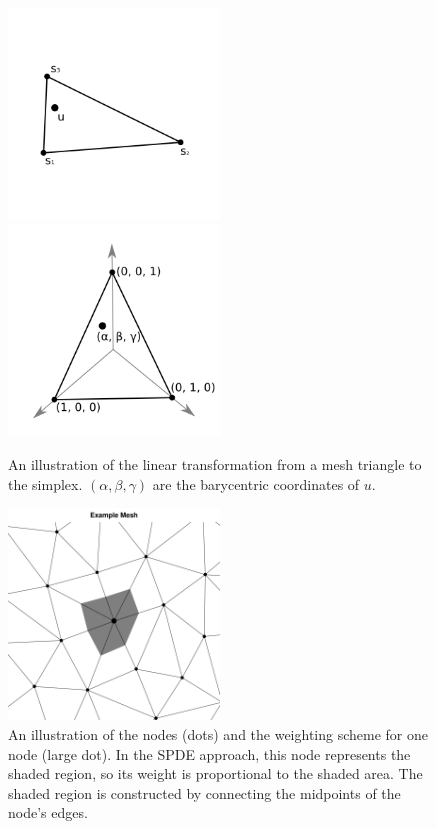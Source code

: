 \documentclass[]{interact}
\begin{document}
\begin{figure}[p]
\includegraphics[width=0.5\textwidth]{figures/triangle.png}
\includegraphics[width=0.5\textwidth]{figures/simplex.png}
\caption{An illustration of the linear transformation from a mesh triangle to
the simplex. \((\alpha, \beta, \gamma)\) are the barycentric coordinates of
\(u\).}
\label{triangle}
\end{figure}

\begin{figure}[h]\centering
\includegraphics[width=0.5\textwidth]{figures/dual.pdf}
\caption{An illustration of the nodes (dots) and the weighting scheme for one
node (large dot). In the SPDE approach, this node represents the shaded
region, so its weight is proportional to the shaded area. The shaded region is
constructed by connecting the midpoints of the node's edges.}
\label{dual}
\end{figure}
\end{document}
